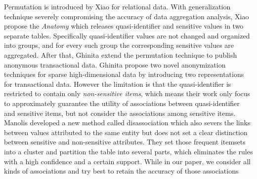
Permutation is introduced by Xiao \etal \cite{Xiao:2006:Anatomy} for
relational data. With generalization technique severely compromising the
accuracy of data aggregation analysis, Xiao \etal propose the
\textit{Anatomy} which releases quasi-identifier and sensitive values in two
separate tables. Specifically quasi-identifier values are not changed and
organized into groups, and for every such group the corresponding sensitive
values are aggregated. After that, Ghinita \etal \cite{2011:TKDE:Anonymous}
extend the permutation technique to publish anonymous transactional data.
Ghinita \etal propose two novel anonymization techniques for sparse
high-dimensional data by introducing two representations for transactional
data. However the limitation is that the quasi-identifier is restricted to
contain only {\em non-sensitive items}, which means their work only focus to
approximately guarantee the utility of associations between quasi-identifier
and sensitive items, but not consider the associations among sensitive items.
Manolis \etal \cite{terrovitis:privacy} developed a new method called disassociation
which also severs the links between values attributed to the same entity but does not
set a clear distinction between sensitive and non-sensitive attributes.
They set those frequent itemsets into a cluster and partition the table into
several parts, which eliminates the rules with
a high confidence and a certain support.
While in our paper, we consider all kinds of associations and try best to
retain the accuracy of those associations
%

